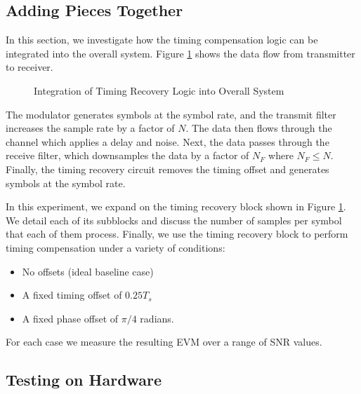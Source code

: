 \documentclass{article}
\begin{document}
\subsection{Adding Pieces Together}
\label{section::sim_procedure}

In this section, we investigate how the timing compensation logic can be integrated into the overall system.  Figure \ref{fig::timing_recovery_integration} shows the data flow from transmitter to receiver.

\begin{figure}[H]
	\centerline{}
	\caption{Integration of Timing Recovery Logic into Overall System}
	\label{fig::timing_recovery_integration}
\end{figure}

\noindent The modulator generates symbols at the symbol rate, and the transmit filter increases the sample rate by a factor of $N$. The data then flows through the channel which applies a delay and noise. Next, the data passes through the receive filter, which downsamples the data by a factor of $N_F$ where $N_F \leq N$. Finally, the timing recovery circuit removes the timing offset and generates symbols at the symbol rate.

	In this experiment, we expand on the timing recovery block shown in Figure \ref{fig::timing_recovery_integration}. We detail each of its subblocks and discuss the number of samples per symbol that each of them process. Finally, we use the timing recovery block to perform timing compensation under a variety of conditions:
	
	\begin{itemize}
		\item No offsets (ideal baseline case)
		\item A fixed timing offset of $0.25T_s$
		\item A fixed phase offset of $\pi/4$ radians.
	\end{itemize}	
	
	\noindent For each case we measure the resulting EVM over a range of SNR values.
	
\subsection{Testing on Hardware}
\end{document}
